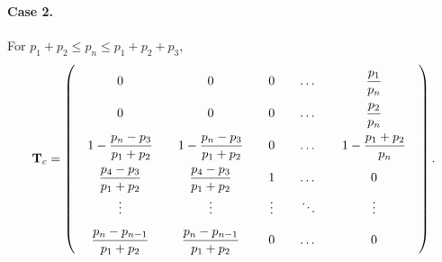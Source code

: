 \documentclass[12pt]{article}
\begin{document}
\paragraph{Case 2.}

For $p_1 + p_2 \le p_n \le p_1 + p_2 + p_3$,
$$
  \mathbf T_{c}
=
\left(
  \arraycolsep=10.0pt\def\arraystretch{2.0}
  \begin{array}{cccccc}
    0     &   0   &   0   &   \dots  &   \dfrac{p_1}{p_n}       \\
    0     &   0   &   0   &   \dots  &   \dfrac{p_2}{p_n} \\
    1 - \dfrac{p_n - p_3}{p_1 + p_2}  &   1 - \dfrac{p_n - p_3}{p_1 + p_2}  &   0   &   \dots  &   1 - \dfrac{p_1+p_2}{p_n} \\
    \dfrac{p_4 - p_3}{p_1 + p_2}     &  \dfrac{p_4 - p_3}{p_1 + p_2}   &   1   &   \dots  &   0 \\
    \vdots&\vdots &\vdots &   \ddots &   \vdots \\
    \dfrac{p_n - p_{n-1}}{p_1 + p_2} &  \dfrac{p_n - p_{n-1}}{p_1 + p_2} &   0   &   \dots  &   0 \\
  \end{array}
\right).
$$

%
\end{document}
